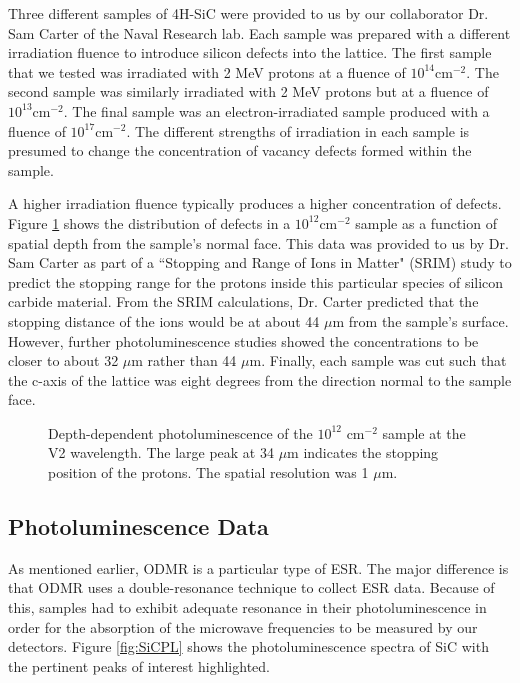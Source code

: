 \documentclass[oneside, astronomy, noacknowlegments]{BYUPhys}
\begin{document}
Three different samples of 4H-SiC were provided to us by our collaborator Dr. Sam Carter of the Naval Research lab. Each sample was prepared with a different irradiation fluence to introduce silicon defects into the lattice. The first sample that we tested was irradiated with 2 MeV protons at a fluence of $10^{14} \text{cm}^{-2}$. The second sample was similarly irradiated with 2 MeV protons but at a fluence of $10^{13} \text{cm}^{-2}$. The final sample was an electron-irradiated sample produced with a fluence of $10^{17} \text{cm}^{-2}$. The different strengths of irradiation in each sample is presumed to change the concentration of vacancy defects formed within the sample.

A higher irradiation fluence typically produces a higher concentration of defects. Figure \ref{fig:SiCDepth} shows the distribution of defects in a $10^{12} \text{cm}^{-2}$ sample as a function of spatial depth from the sample's normal face. This data was provided to us by Dr. Sam Carter as part of a ``Stopping and Range of Ions in Matter" (SRIM) study to predict the stopping range for the protons inside this particular species of silicon carbide material. From the SRIM calculations, Dr. Carter predicted that the stopping distance of the ions would be at about 44 $\mu$m from the sample's surface. However, further photoluminescence studies showed the concentrations to be closer to about 32 $\mu$m rather than 44 $\mu$m. Finally, each sample was cut such that the c-axis of the lattice was eight degrees from the direction normal to the sample face.

\begin{figure}
    \caption[SiC Depth-Dependent Photoluminescence]{\label{fig:SiCDepth}
     Depth-dependent photoluminescence of the $10^{12}$ $\text{cm}^{−2}$ sample at the V2 wavelength. The large peak at 34 $\mu$m indicates the stopping position of the protons. The spatial resolution was 1 $\mu$m.}
 \end{figure}

\subsection{Photoluminescence Data}

As mentioned earlier, ODMR is a particular type of ESR. The major difference is that ODMR uses a double-resonance technique to collect ESR data. Because of this, samples had to exhibit adequate resonance in their photoluminescence in order for the absorption of the microwave frequencies to be measured by our detectors. Figure \ref{fig:SiCPL} shows the photoluminescence spectra of SiC with the pertinent peaks of interest highlighted.
\end{document}
